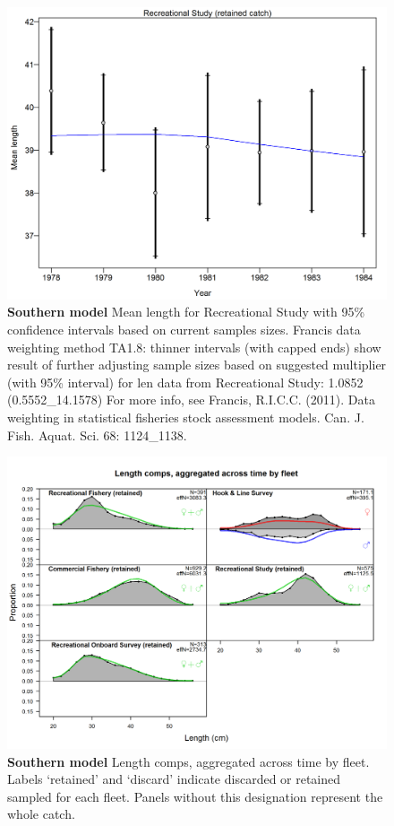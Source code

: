 \documentclass[12pt,]{article}
\begin{document}
\begin{figure}[htbp]
\centering
\includegraphics{./r4ss/plots_mod2/comp_lenfit_data_weighting_TA1.8_Recreational Study.png}
\caption{\textbf{Southern model} Mean length for Recreational Study with
95\% confidence intervals based on current samples sizes. Francis data
weighting method TA1.8: thinner intervals (with capped ends) show result
of further adjusting sample sizes based on suggested multiplier (with
95\% interval) for len data from Recreational Study: 1.0852
(0.5552\_14.1578) For more info, see Francis, R.I.C.C. (2011). Data
weighting in statistical fisheries stock assessment models. Can. J.
Fish. Aquat. Sci. 68: 1124\_1138.
\label{fig:mod2_20_comp_lenfit_data_weighting_TA1.8_Recreational Study}}
\end{figure}

\begin{figure}[htbp]
\centering
\includegraphics{./r4ss/plots_mod2/comp_lenfit__aggregated_across_time.png}
\caption{\textbf{Southern model} Length comps, aggregated across time by
fleet. Labels `retained' and `discard' indicate discarded or retained
sampled for each fleet. Panels without this designation represent the
whole catch. \label{fig:mod2_21_comp_lenfit__aggregated_across_time}}
\end{figure}
\end{document}
